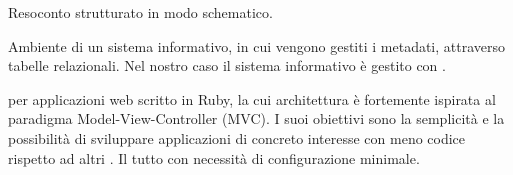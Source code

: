 \begin{itemize}

Resoconto strutturato in modo schematico.


Ambiente di un sistema informativo, in cui vengono gestiti i metadati, attraverso tabelle relazionali.
Nel nostro caso il sistema informativo è gestito con .


  per applicazioni web scritto in Ruby, la cui architettura è fortemente ispirata al paradigma Model-View-Controller (MVC). I suoi obiettivi sono la semplicità e la possibilità di sviluppare applicazioni di concreto interesse con meno codice rispetto ad altri . Il tutto con necessità di configurazione minimale.

\end{itemize}


